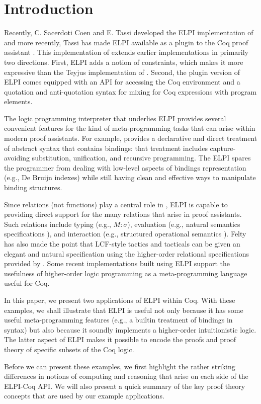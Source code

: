 \section{Introduction}
\label{sec:intro}

Recently, C. Sacerdoti Coen and E. Tassi developed the ELPI
implementation \cite{dunchev15lpar} of \lP \cite{miller12proghol} and
more recently, Tassi has made ELPI available as a plugin to the Coq
proof assistant \cite{tassi18coqpl}.  This implementation of \lP
extends earlier implementations in primarily two directions.  First,
ELPI adds a notion of constraints, which makes it more expressive than
the Teyjus implementation \cite{nadathur99cade} of \lP. Second, the
plugin version of ELPI comes equipped with an API for accessing the
Coq environment and a quotation and anti-quotation syntax for mixing
for Coq expressions with \lP program elements.

The logic programming interpreter that underlies ELPI provides several
convenient features for the kind of meta-programming tasks that can
arise within modern proof assistants.  For example, \lP provides a
declarative and direct treatment of abstract syntax that contains
bindings: that treatment includes capture-avoiding substitution,
unification, and recursive programming.  The ELPI spares the
programmer from dealing with low-level aspects of bindings
representation (e.g., De Bruijn indexes) while still having clean and
effective ways to manipulate binding structures.

Since relations (not functions) play a central role in \lP, ELPI is
capable to providing direct support for the many relations that arise
in proof assistants.  Such relations include typing (e.g.,
$M\colon\sigma$), evaluation (e.g., natural semantics specifications
\cite{kahn87stacs,hannan93jfp}), and interaction (e.g., structured
operational semantics \cite{plotkin81,milner89book}).  Felty has also
made the point that LCF-style tactics and tacticals can be given an
elegant and natural specification using the higher-order relational
specifications provided by \lP \cite{felty93jar}.  Some recent
implementations built using ELPI
\cite{coen19mscs,tassi18coqpl,tassi19itp} support the usefulness of
higher-order logic programming as a meta-programming language useful
for Coq.

In this paper, we present two applications of ELPI within Coq. With
these examples, we shall illustrate that ELPI is useful not only
because it has some useful meta-programming features (e.g., a builtin
treatment of bindings in syntax) but also because it soundly
implements a higher-order intuitionistic logic.  The latter aspect of
ELPI makes it possible to encode the proofs and proof theory of
specific subsets of the Coq logic.

Before we can present these examples, we first highlight the rather
striking differences in notions of computing and reasoning that arise
on each side of the ELPI-Coq API.   We will also present a quick
summary of the key proof theory concepts that are used by our example
applications.
